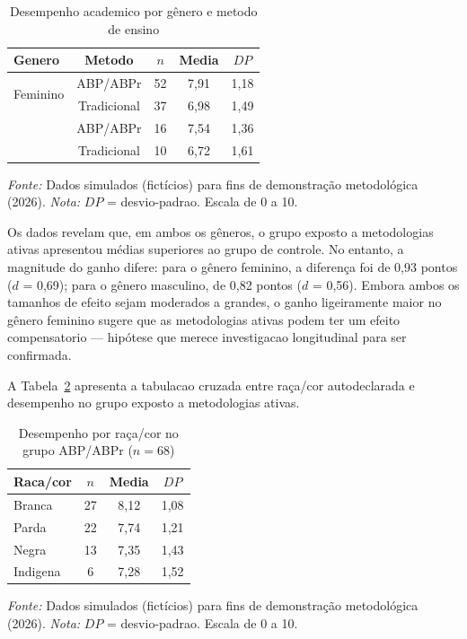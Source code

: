 \begin{table}[htbp]
    \centering
    \caption{Desempenho academico por gênero e metodo de ensino}
    \label{tab:equidade_gênero}
    \small
    \begin{tabular}{lcccc}
        \toprule
        \textbf{Genero} & \textbf{Metodo} & \textbf{$n$} & \textbf{Media} & \textbf{$DP$} \\
        \midrule
        \multirow{2}{*}{Feminino} & ABP/ABPr & 52 & 7,91 & 1,18 \\
        & Tradicional & 37 & 6,98 & 1,49 \\
        \addlinespace
        \multirow{2}{*}{Masculino} & ABP/ABPr & 16 & 7,54 & 1,36 \\
        & Tradicional & 10 & 6,72 & 1,61 \\
        \bottomrule
    \end{tabular}
    \par\medskip
    \footnotesize{\textit{Fonte:} Dados simulados (fictícios) para fins de demonstração metodológica (2026). \textit{Nota:} $DP$ = desvio-padrao. Escala de 0 a 10.}
\end{table}

Os dados revelam que, em ambos os gêneros, o grupo exposto a metodologias ativas apresentou médias superiores ao grupo de controle. No entanto, a magnitude do ganho difere: para o gênero feminino, a diferença foi de 0,93 pontos ($d$ = 0,69); para o gênero masculino, de 0,82 pontos ($d$ = 0,56). Embora ambos os tamanhos de efeito sejam moderados a grandes, o ganho ligeiramente maior no gênero feminino sugere que as metodologias ativas podem ter um efeito compensatorio — hipótese que merece investigacao longitudinal para ser confirmada.

A Tabela~\ref{tab:equidade_raça} apresenta a tabulacao cruzada entre raça/cor autodeclarada e desempenho no grupo exposto a metodologias ativas.

\begin{table}[htbp]
    \centering
    \caption{Desempenho por raça/cor no grupo ABP/ABPr ($n = 68$)}
    \label{tab:equidade_raça}
    \small
    \begin{tabular}{lccc}
        \toprule
        \textbf{Raca/cor} & \textbf{$n$} & \textbf{Media} & \textbf{$DP$} \\
        \midrule
        Branca & 27 & 8,12 & 1,08 \\
        Parda & 22 & 7,74 & 1,21 \\
        Negra & 13 & 7,35 & 1,43 \\
        Indigena & 6 & 7,28 & 1,52 \\
        \bottomrule
    \end{tabular}
    \par\medskip
    \footnotesize{\textit{Fonte:} Dados simulados (fictícios) para fins de demonstração metodológica (2026). \textit{Nota:} $DP$ = desvio-padrao. Escala de 0 a 10.}
\end{table}

